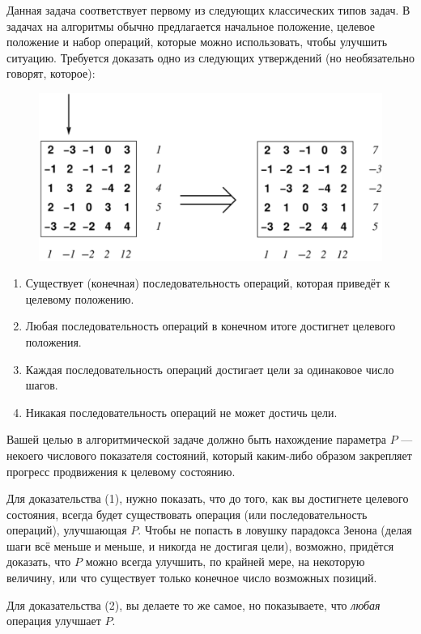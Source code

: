 Данная задача соответствует первому из следующих классических типов задач.
В задачах на алгоритмы обычно предлагается начальное положение, целевое положение и набор операций, которые можно использовать, чтобы улучшить ситуацию.
Требуется доказать одно из следующих утверждений (но необязательно говорят, которое):
\begin{figure}
\centering
\includegraphics[scale=0.6]{Figs/Algorithms/array}
\end{figure}
\begin{enumerate}[(1)]
\item Существует (конечная) последовательность операций, которая приведёт к целевому положению.
\item Любая последовательность операций в конечном итоге достигнет целевого положения.
\item Каждая последовательность операций достигает цели за одинаковое число шагов.
\item Никакая последовательность операций не может достичь цели.
\end{enumerate}

Вашей целью в алгоритмической задаче должно быть нахождение параметра $P$ --- некоего числового показателя состояний, который каким-либо образом закрепляет прогресс продвижения к целевому состоянию.

Для доказательства (1), нужно показать, что до того, как вы достигнете целевого состояния, всегда будет существовать операция (или последовательность операций), улучшающая $P$.
Чтобы не попасть в ловушку парадокса Зенона (делая шаги всё меньше и меньше, и никогда не достигая цели), возможно, придётся доказать, что $P$ можно всегда улучшить, по крайней мере, на некоторую величину, или что существует только конечное число возможных позиций.

Для доказательства (2), вы делаете то же самое, но показываете, что \emph{любая} операция улучшает $P$.

